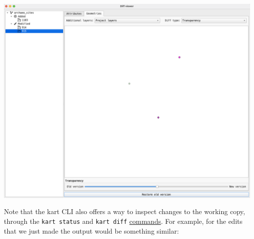 \documentclass[
  letterpaper,
  DIV=11,
  numbers=noendperiod]{scrartcl}
\begin{document}
\begin{center}
\includegraphics{img/kart-diff-geometry.png}
\end{center}

Note that the kart CLI also offers a way to inspect changes to the
working copy, through the \texttt{kart\ status} and \texttt{kart\ diff}
\href{https://docs.kartproject.org/en/latest/pages/basic_usage_tutorial.html\#making-and-committing-changes}{commands}.
For example, for the edits that we just made the output would be
something similar:
\end{document}
